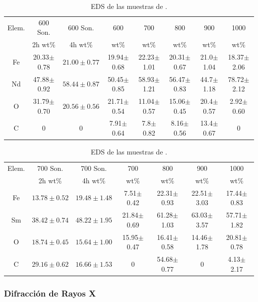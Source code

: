 \documentclass[../main.tex]{subfiles}
\begin{document}
\begin{table}[H]
    \begin{tabular}{|c||c|c|c|c|c|c|c|}
        \hline
        Elem. &600\gradoC{} Son.&600\gradoC{} Son.&600\gradoC{}&700\gradoC{}&800\gradoC{}&900\gradoC{}&1000\gradoC{}\\
        &2h wt\%&4h wt\%&wt\%&wt\%&wt\%&wt\%&wt\%\\
        \hline\hline
        Fe & 20.33$\pm$0.78 &$21.00\pm0.77$& 19.94$\pm$0.68 & 22.23$\pm$1.01 & 20.31$\pm$0.67 & 21.0$\pm$1.04 & 18.37$\pm$2.06 \\
        Nd & 47.88$\pm$0.92 &$58.44\pm0.87$& 50.45$\pm$0.85 & 58.93$\pm$1.21 & 56.47$\pm$0.83 & 44.7$\pm$1.18 & 78.72$\pm$2.12 \\
        O & 31.79$\pm$0.70 &$20.56\pm0.56$& 21.71$\pm$0.54 & 11.04$\pm$0.57 & 15.06$\pm$0.45 & 20.4$\pm$0.57 & 2.92$\pm$0.60 \\
        C & 0 & 0 & 7.91$\pm$0.64 & 7.8$\pm$0.82 & 8.16$\pm$0.56 & 13.4$\pm$0.67 &0 \\ 
        \hline
        \end{tabular} 
            \caption{EDS de las muestras de \neod{}.}
            \label{tab:EDSNd}
        \end{table}
        \begin{table}[H]
            \centering
        \begin{tabular}{|c||c|c|c|c|c|c|}
        \hline
        Elem. &700\gradoC{} Son.&700\gradoC{} Son.&700\gradoC{}&800\gradoC{}&900\gradoC{}&1000\gradoC{}\\
        &2h wt\%&4h wt\%&wt\%&wt\%&wt\%&wt\%\\
        \hline\hline
        Fe &$13.78\pm0.52$&$19.48\pm1.48$& 7.51$\pm$0.42 & 22.31$\pm$0.93 & 22.51$\pm$3.03 & 17.44$\pm$0.83 \\
        Sm &$38.42\pm0.74$&$48.22\pm1.95$& 21.84$\pm$0.69 & 61.28$\pm$1.03 & 63.03$\pm$3.57 & 57.71$\pm$1.82 \\
        O &$18.74\pm0.45$&$15.64\pm1.00$& 15.95$\pm$0.47 & 16.41$\pm$0.58 & 14.46$\pm$1.78 & 20.81$\pm$0.78 \\
        C &$29.16\pm0.62$&$16.66\pm1.53$& 0 & 54.68$\pm$0.77 & 0 & 4.13$\pm$2.17 \\ 
        \hline
        \end{tabular} 
            \caption{EDS de las muestras de \sama{}.}
            \label{tab:EDSSm}
\end{table}
\subsubsection{Difracción de Rayos X} \label{sec:analisisDRX}
\end{document}
